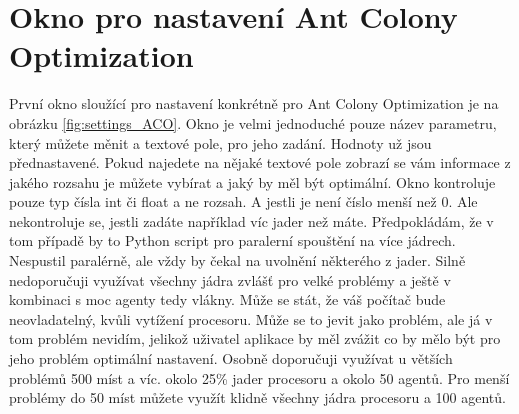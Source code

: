 \section{Okno pro nastavení Ant Colony Optimization}
První okno sloužící pro nastavení konkrétně pro Ant Colony Optimization je na obrázku \ref{fig:settings_ACO}. Okno je velmi jednoduché pouze název parametru, který můžete měnit a textové pole, pro jeho zadání. Hodnoty už jsou přednastavené. Pokud najedete na nějaké textové pole zobrazí se vám informace z jakého rozsahu je můžete vybírat a jaký by měl být optimální. Okno kontroluje pouze typ čísla int či float a ne rozsah. A jestli je není číslo menší než 0. Ale nekontroluje se, jestli zadáte například víc jader než máte. Předpokládám, že v tom případě by to Python script pro paralerní spouštění na více jádrech. Nespustil paralérně, ale vždy by čekal na uvolnění některého z jader. Silně nedoporučuji využívat všechny jádra zvlášť pro velké problémy a ještě v kombinaci s moc agenty tedy vlákny. Může se stát, že váš počítač bude neovladatelný, kvůli vytížení procesoru. Může se to jevit jako problém, ale já v tom problém nevidím, jelikož uživatel aplikace by měl zvážit co by mělo být pro jeho problém optimální nastavení. Osobně doporučuji využívat u větších problémů 500 míst a víc. okolo 25\% jader procesoru a okolo 50 agentů. Pro menší problémy do 50 míst můžete využít klidně všechny jádra procesoru a 100 agentů.
